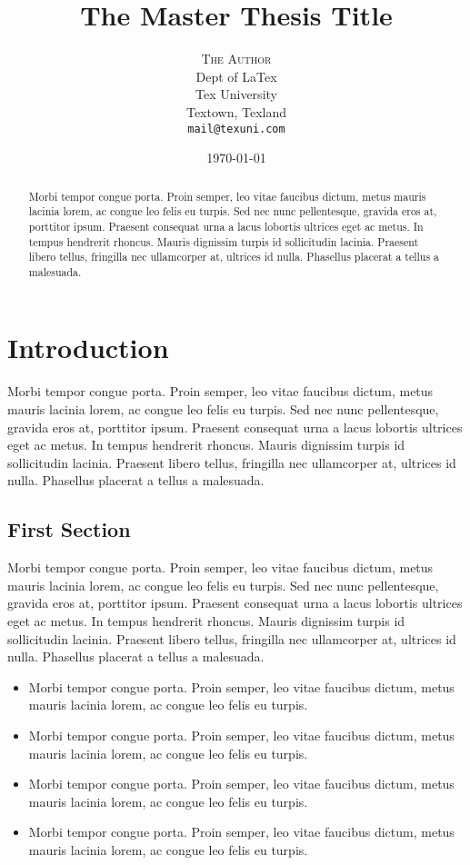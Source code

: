 \documentclass[11pt,titlepage,twoside,openright]{report}
\title{\textbf{The Master Thesis Title}}
\author{\textsc{The Author}\\
	Dept of LaTex\\
	Tex University\\
	Textown, Texland\\
	\texttt{mail@texuni.com}}
\date{\today}
\begin{document}
\maketitle
\tableofcontents
\newpage


\begin{abstract}
Morbi tempor congue porta. Proin semper, leo vitae faucibus dictum, metus mauris lacinia lorem, ac congue leo felis eu turpis. Sed nec nunc pellentesque, gravida eros at, porttitor ipsum. Praesent consequat urna a lacus lobortis ultrices eget ac metus. In tempus hendrerit rhoncus. Mauris dignissim turpis id sollicitudin lacinia. Praesent libero tellus, fringilla nec ullamcorper at, ultrices id nulla. Phasellus placerat a tellus a malesuada.
\end{abstract}

\newpage

\chapter[Chapter Name]{Introduction}

Morbi tempor congue porta. Proin semper, leo vitae faucibus dictum, metus mauris lacinia lorem, ac congue leo felis eu turpis. Sed nec nunc pellentesque, gravida eros at, porttitor ipsum. Praesent consequat urna a lacus lobortis ultrices eget ac metus. In tempus hendrerit rhoncus. Mauris dignissim turpis id sollicitudin lacinia. Praesent libero tellus, fringilla nec ullamcorper at, ultrices id nulla. Phasellus placerat a tellus a malesuada.


\newpage

\section[Section Name]{First Section}

Morbi tempor congue porta. Proin semper, leo vitae faucibus dictum, metus mauris lacinia lorem, ac congue leo felis eu turpis. Sed nec nunc pellentesque, gravida eros at, porttitor ipsum. Praesent consequat urna a lacus lobortis ultrices eget ac metus. In tempus hendrerit rhoncus. Mauris dignissim turpis id sollicitudin lacinia. Praesent libero tellus, fringilla nec ullamcorper at, ultrices id nulla. Phasellus placerat a tellus a malesuada.

\begin{itemize}
	\item Morbi tempor congue porta. Proin semper, leo vitae faucibus dictum, metus mauris lacinia lorem, ac congue leo felis eu turpis. 
	\item Morbi tempor congue porta. Proin semper, leo vitae faucibus dictum, metus mauris lacinia lorem, ac congue leo felis eu turpis. 
	\item Morbi tempor congue porta. Proin semper, leo vitae faucibus dictum, metus mauris lacinia lorem, ac congue leo felis eu turpis. 
	\item Morbi tempor congue porta. Proin semper, leo vitae faucibus dictum, metus mauris lacinia lorem, ac congue leo felis eu turpis. 
\end{itemize}
\end{document}
